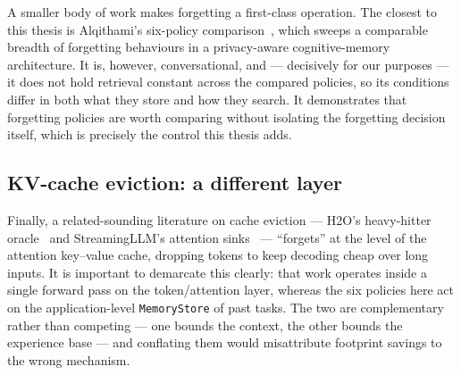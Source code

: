 A smaller body of work makes forgetting a first-class operation. The closest to this thesis
is Alqithami's six-policy comparison~\cite{alqithami2025}, which sweeps a comparable breadth
of forgetting behaviours in a privacy-aware cognitive-memory architecture. It is, however,
conversational, and --- decisively for our purposes --- it does not hold retrieval constant
across the compared policies, so its conditions differ in both what they store and how they
search. It demonstrates that forgetting policies are worth comparing without isolating the
forgetting decision itself, which is precisely the control this thesis adds.

\subsection{KV-cache eviction: a different layer}

Finally, a related-sounding literature on cache eviction --- H2O's heavy-hitter
oracle~\cite{zhang2023h2o} and StreamingLLM's attention sinks~\cite{xiao2024streamingllm}
--- ``forgets'' at the level of the attention key--value cache, dropping tokens to keep
decoding cheap over long inputs. It is important to demarcate this clearly: that work
operates inside a single forward pass on the token/attention layer, whereas the six policies
here act on the application-level \texttt{MemoryStore} of past tasks. The two are
complementary rather than competing --- one bounds the context, the other bounds the
experience base --- and conflating them would misattribute footprint savings to the wrong
mechanism.
